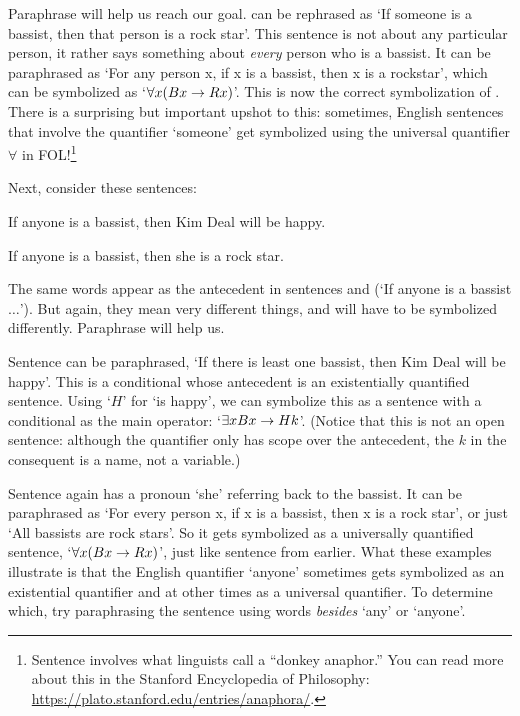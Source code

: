 Paraphrase will help us reach our goal.   can be rephrased as `If someone is a bassist, then that person is a rock star'. This sentence is not about any particular person, it rather says something about \emph{every} person who is a bassist.  It can be paraphrased as `For any person x, if x is a bassist, then x is a rockstar', which can be symbolized as `$\forall x (Bx \rightarrow Rx)$'.  This is now the correct symbolization of .  There is a surprising but important upshot to this: sometimes, English sentences that involve the quantifier `someone' get symbolized using the universal quantifier $\forall$ in FOL!\footnote{Sentence  involves what linguists call a ``donkey anaphor.''  You can read more about this in the Stanford Encyclopedia of Philosophy: \href{https://plato.stanford.edu/entries/anaphora/}{https://plato.stanford.edu/entries/anaphora/}.}




Next, consider these sentences:
	\begin{earg}
		\item[\ex{anyone1}] If anyone is a bassist, then Kim Deal will be happy.
		\item[\ex{anyone2}] If anyone is a bassist, then she is a rock star.
	\end{earg}
The same words appear as the antecedent in sentences  and   (`If anyone is a bassist$\ldots$'). But again, they mean very different things, and will have to be symbolized differently.  Paraphrase will help us.

Sentence  can be paraphrased, `If there is least one bassist, then Kim Deal will be happy'. This is a conditional whose antecedent is an existentially quantified sentence.  Using `$H$' for `\blank is happy', we can symbolize this as a sentence with a conditional as the main operator: `$\exists x Bx \rightarrow Hk$'.  (Notice that this is not an open sentence: although the quantifier only has scope over the antecedent, the $k$ in the consequent is a name, not a variable.)

Sentence  again has a pronoun `she' referring back to the bassist.  It can be paraphrased as `For every person x, if x is a bassist, then x is a rock star', or just `All bassists are rock stars'. So it gets symbolized as a universally quantified sentence, `$\forall x(Bx \rightarrow Rx)$', just like sentence  from earlier.  What these examples illustrate is that the English quantifier `anyone' sometimes gets symbolized as an existential quantifier and at other times as a universal quantifier.   To determine which, try paraphrasing the sentence using words \emph{besides} `any' or `anyone'.


